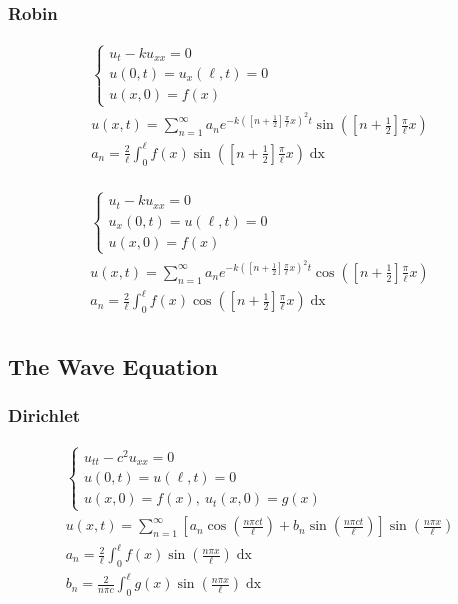 \subsubsection*{Robin}
\begin{minipage}{0.5\textwidth}
\begin{gather*}
\begin{cases}
u_{t} - ku_{xx} = 0\\
u(0,t) = u_{x}(\ell,t) = 0\\
u(x,0) = f(x)
\end{cases}\\
u(x,t) = \sum_{n=1}^{\infty}a_{n}e^{-k\left(\left[n +
\frac{1}{2}\right]\frac{\pi}{\ell}x\right)^{2}t}\sin{\left(\left[n +
\frac{1}{2}\right]\frac{\pi}{\ell}x\right)}\\
a_{n} = \frac{2}{\ell}\int_{0}^{\ell}f(x)\sin{\left(\left[n +
\frac{1}{2}\right]\frac{\pi}{\ell}x\right)}\mathop{dx}\\
\end{gather*}
\end{minipage}
\begin{minipage}{0.5\textwidth}
\begin{gather*}
\begin{cases}
u_{t} - ku_{xx} = 0\\
u_{x}(0,t) = u(\ell,t) = 0\\
u(x,0) = f(x)
\end{cases}\\
u(x,t) = \sum_{n=1}^{\infty}a_{n}e^{-k\left(\left[n +
\frac{1}{2}\right]\frac{\pi}{\ell}x\right)^{2}t}\cos{\left(\left[n +
\frac{1}{2}\right]\frac{\pi}{\ell}x\right)}\\
a_{n} = \frac{2}{\ell}\int_{0}^{\ell}f(x)\cos{\left(\left[n +
\frac{1}{2}\right]\frac{\pi}{\ell}x\right)}\mathop{dx}\\
\end{gather*}
\end{minipage}


\subsection{The Wave Equation}
\subsubsection*{Dirichlet}
\begin{gather*}
\begin{cases}
u_{tt} - c^{2}u_{xx} = 0\\
u(0,t) = u(\ell,t) = 0\\
u(x,0) = f(x),\ u_{t}(x,0) = g(x)
\end{cases}\\
u(x,t) = \sum_{n=1}^{\infty}\left[a_{n}\cos{\left(\frac{n\pi c t}{\ell}\right)} +
b_{n}\sin{\left(\frac{n\pi c t}{\ell}\right)}\right]\sin{\left(\frac{n\pi x}{\ell}\right)}\\
a_{n} = \frac{2}{\ell}\int_{0}^{\ell}f(x)\sin{\left(\frac{n\pi x}{\ell}\right)}\mathop{dx}\\
b_{n} = \frac{2}{n\pi c}\int_{0}^{\ell}g(x)\sin{\left(\frac{n\pi x}{\ell}\right)}\mathop{dx}\\
\end{gather*}

